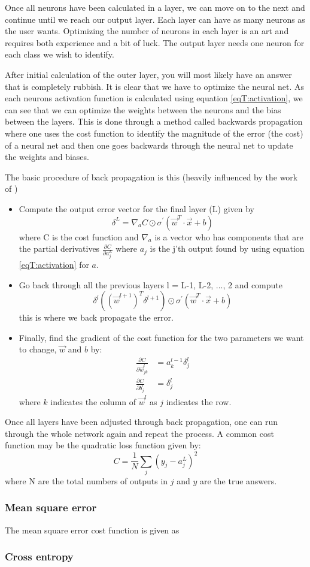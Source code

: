 Once all neurons have been calculated in a layer, we can move on to the next and continue until we reach our output layer. Each layer can have as many neurons as the user wants. Optimizing the number of neurons in each layer is an art and requires both experience and a bit of luck. The output layer needs one neuron for each class we wish to identify.

After initial calculation of the outer layer, you will most likely have an answer that is completely rubbish. It is clear that we have to optimize the neural net. As each neurons activation function is calculated using equation \eqref{eqT:activation}, we can see that we can optimize the weights between the neurons and the bias between the layers. This is done through a method called backwards propagation where one uses the cost function to identify the magnitude of the error (the cost) of a neural net and then one goes backwards through the neural net to update the weights and biases.

The basic procedure of back propagation is this (heavily influenced by the work of \citet{Nielsen})
\begin{itemize}
\item Compute the output error vector for the final layer (L) given by
\begin{equation*}
\delta^L = \nabla_a C \odot \sigma^{'}(\vec{w}^T \cdot \vec{x} + b)
\end{equation*}
where C is the cost function and $\nabla_a$ is a vector who has components that are the partial derivatives $\frac{\partial C}{\partial a_j^L}$ where $a_j$ is the j'th output found by using equation \eqref{eqT:activation} for $a$.
\item Go back through all the previous layers l = L-1, L-2, ..., 2 and compute
\begin{equation*}
\delta^l ((\vec{w}^{l + 1})^T \delta^{l + 1}) \odot \sigma^{'}(\vec{w}^T \cdot \vec{x} + b)
\end{equation*}
this is where we back propagate the error.
\item Finally, find the gradient of the cost function for the two parameters we want to change, $\vec{w}$ and $b$ by:
\begin{align*}
\frac{\partial C}{\partial \vec{w}_{jk}^l} &= a_k^{l-1}\delta_{j}^{l} \\
\frac{\partial C}{\partial b_{j}^l} &= \delta_{j}^{l}
\end{align*}
where $k$ indicates the column of $\vec{w}^l$ as $j$ indicates the row.
\end{itemize}
Once all layers have been adjusted through back propagation, one can run through the whole network again and repeat the process. A common cost function may be the quadratic loss function given by:
\begin{equation}
C = \frac{1}{N} \sum\limits_{j} (y_j - a_j^L)^2
\end{equation}
where N are the total numbers of outputs in $j$ and $y$ are the true answers.

\subsubsection{Mean square error}
The mean square error cost function is given as 

\subsubsection{Cross entropy}